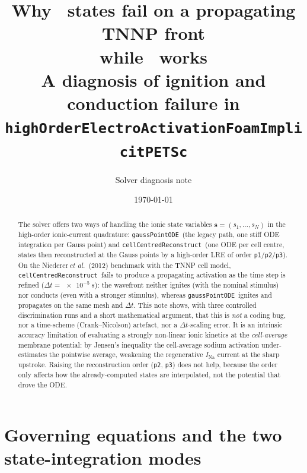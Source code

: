 \documentclass[11pt,a4paper]{article}
\title{Why \ccrec\ states fail on a propagating TNNP front\\
       while \gpode\ works\\[2pt]
       \large A diagnosis of ignition and conduction failure in
       \texttt{highOrderElectroActivationFoamImplicitPETSc}}
\author{Solver diagnosis note}
\date{\today}
\newcommand{\code}[1]{\texttt{\small #1}}
\newcommand{\gpode}{\code{gaussPointODE}}
\newcommand{\ccrec}{\code{cellCentredReconstruct}}
\newcommand{\states}{\mathbf{s}}
\begin{document}
\maketitle

\begin{abstract}
The solver offers two ways of handling the ionic state variables
$\states=(s_1,\dots,s_{N})$ in the high-order ionic-current quadrature:
\gpode\ (the legacy path, one stiff ODE integration per Gauss point) and
\ccrec\ (one ODE per cell centre, states then reconstructed at the Gauss points
by a high-order LRE of order \code{p1}/\code{p2}/\code{p3}). On the
Niederer\,\emph{et al.}~(2012) benchmark with the TNNP cell model, \ccrec\ fails
to produce a propagating activation as the time step is refined
($\Delta t=\SI{e-5}{s}$): the wavefront neither ignites (with the nominal
stimulus) nor conducts (even with a stronger stimulus), whereas \gpode\ ignites
and propagates on the same mesh and $\Delta t$. This note shows, with three
controlled discrimination runs and a short mathematical argument, that this is
\emph{not} a coding bug, nor a time-scheme (Crank--Nicolson) artefact, nor a
$\Delta t$-scaling error. It is an intrinsic accuracy limitation of evaluating a
strongly non-linear ionic kinetics at the \emph{cell-average} membrane potential:
by Jensen's inequality the cell-average sodium activation under-estimates the
pointwise average, weakening the regenerative $I_{\mathrm{Na}}$ current at the
sharp upstroke. Raising the reconstruction order (\code{p2}, \code{p3}) does not
help, because the order only affects how the already-computed states are
interpolated, not the potential that drove the ODE.
\end{abstract}

\section{Governing equations and the two state-integration modes}
\end{document}
